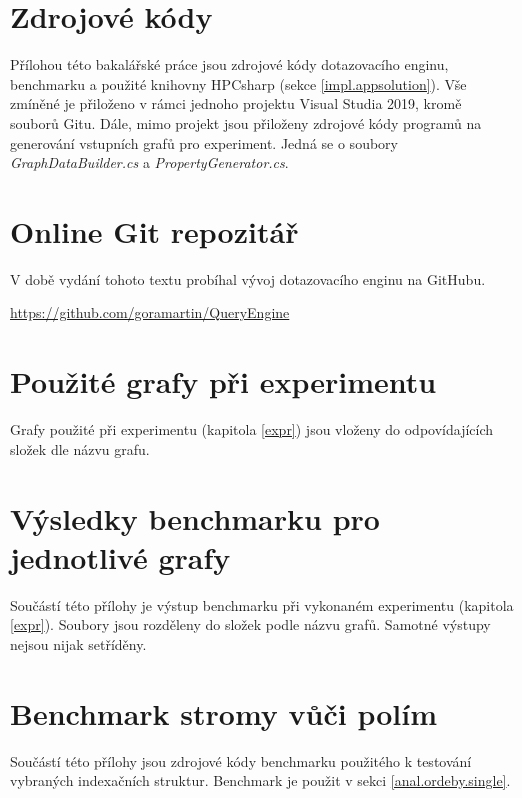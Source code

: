 \section{Zdrojové kódy}
\label{prilohy.kod}

Přílohou této bakalářské práce jsou zdrojové kódy dotazovacího enginu, benchmarku a použité knihovny HPCsharp (sekce \ref{impl.appsolution}).
Vše zmíněné je přiloženo v rámci jednoho projektu Visual Studia 2019, kromě souborů Gitu. Dále, mimo projekt jsou přiloženy
zdrojové kódy programů na generování vstupních grafů pro experiment. Jedná se o soubory \textit{GraphDataBuilder.cs} a \textit{PropertyGenerator.cs}.

\section{Online Git repozitář}
\label{prilohy.repo}

V době vydání tohoto textu probíhal vývoj dotazovacího enginu na GitHubu.

\begin{center}
\url{https://github.com/goramartin/QueryEngine}
\end{center}

\section{Použité grafy při experimentu}
\label{prilohy.grafy}

Grafy použité při experimentu (kapitola \ref{expr}) jsou vloženy do odpovídajících složek dle názvu grafu. 

\section{Výsledky benchmarku pro jednotlivé grafy}
\label{prilohy.grafyVysledky}

Součástí této přílohy je výstup benchmarku při vykonaném experimentu (kapitola \ref{expr}).
Soubory jsou rozděleny do složek podle názvu grafů.
Samotné výstupy nejsou nijak setříděny.

\section{Benchmark stromy vůči polím}
\label{prilohy.benchtreevsarray}

Součástí této přílohy jsou zdrojové kódy benchmarku použitého k testování vybraných indexačních struktur.
Benchmark je použit v sekci \ref{anal.ordeby.single}.